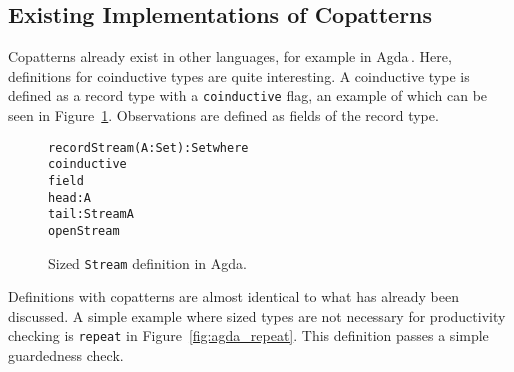 









\subsection{Existing Implementations of Copatterns}
Copatterns already exist in other languages, for example in Agda\,\cite{Norell:thesis}. Here, definitions for coinductive types are quite interesting. A coinductive type is defined as a record type with a \texttt{coinductive} flag, an example of which can be seen in Figure~\ref{fig:agda_stream}. Observations are defined as fields of the record type.


\begin{figure}
\begin{alltt}
record Stream (A : Set) : Set where
  coinductive
  field
    head : A
    tail : Stream A
open Stream
\end{alltt}
\caption{Sized \texttt{Stream} definition in Agda.}
\label{fig:agda_stream}
\end{figure}

Definitions with copatterns are almost identical to what has already been discussed. A simple example where sized types are not necessary for productivity checking is \texttt{repeat} in Figure~\ref{fig:agda_repeat}. This definition passes a simple guardedness check.


